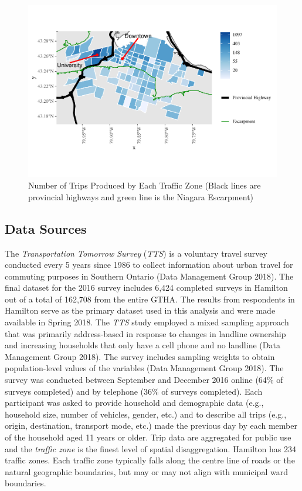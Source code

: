 \documentclass[smallextended]{svjour3}       %
\begin{document}
\begin{figure}
\centering
\includegraphics{Correlates-cycling-flows-routes_files/figure-latex/trips-by-origin-1.pdf}
\caption{\label{fig:trips-by-origin} Number of Trips Produced by Each
Traffic Zone (Black lines are provincial highways and green line is the
Niagara Escarpment)}
\end{figure}

\hypertarget{data-sources}{%
\subsection{Data Sources}\label{data-sources}}

The \emph{Transportation Tomorrow Survey} (\emph{TTS}) is a voluntary
travel survey conducted every 5 years since 1986 to collect information
about urban travel for commuting purposes in Southern Ontario (Data
Management Group 2018). The final dataset for the 2016 survey includes
6,424 completed surveys in Hamilton out of a total of 162,708 from the
entire GTHA. The results from respondents in Hamilton serve as the
primary dataset used in this analysis and were made available in Spring
2018. The \emph{TTS} study employed a mixed sampling approach that was
primarily address-based in response to changes in landline ownership and
increasing households that only have a cell phone and no landline (Data
Management Group 2018). The survey includes sampling weights to obtain
population-level values of the variables (Data Management Group 2018).
The survey was conducted between September and December 2016 online
(64\% of surveys completed) and by telephone (36\% of surveys
completed). Each participant was asked to provide household and
demographic data (e.g., household size, number of vehicles, gender,
etc.) and to describe all trips (e.g., origin, destination, transport
mode, etc.) made the previous day by each member of the household aged
11 years or older. Trip data are aggregated for public use and the
\emph{traffic zone} is the finest level of spatial disaggregation.
Hamilton has 234 traffic zones. Each traffic zone typically falls along
the centre line of roads or the natural geographic boundaries, but may
or may not align with municipal ward boundaries.
\end{document}
